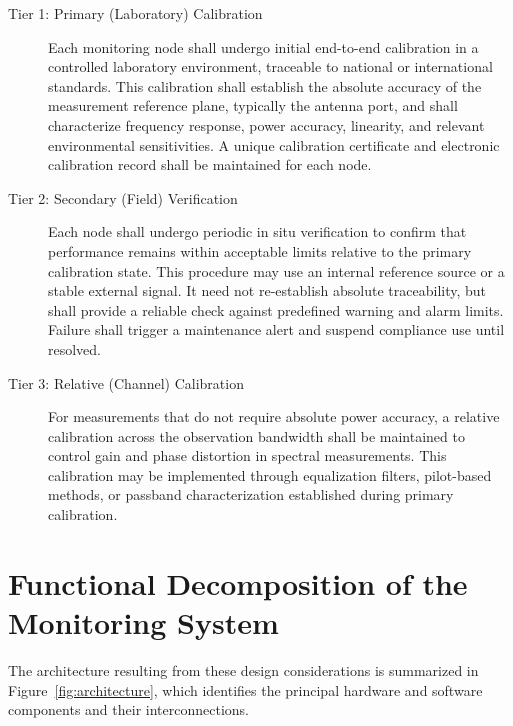 \documentclass[11pt]{article}
\begin{document}
\begin{description}

\item[Tier 1: Primary (Laboratory) Calibration] Each monitoring node shall undergo initial end-to-end calibration in a controlled laboratory environment, traceable to national or international standards. This calibration shall establish the absolute accuracy of the measurement reference plane, typically the antenna port, and shall characterize frequency response, power accuracy, linearity, and relevant environmental sensitivities. A unique calibration certificate and electronic calibration record shall be maintained for each node.

\item[Tier 2: Secondary (Field) Verification] Each node shall undergo periodic in situ verification to confirm that performance remains within acceptable limits relative to the primary calibration state. This procedure may use an internal reference source or a stable external signal. It need not re-establish absolute traceability, but shall provide a reliable check against predefined warning and alarm limits. Failure shall trigger a maintenance alert and suspend compliance use until resolved.

\item[Tier 3: Relative (Channel) Calibration] For measurements that do not require absolute power accuracy, a relative calibration across the observation bandwidth shall be maintained to control gain and phase distortion in spectral measurements. This calibration may be implemented through equalization filters, pilot-based methods, or passband characterization established during primary calibration.

\end{description}

\section{Functional Decomposition of the Monitoring System}

The architecture resulting from these design considerations is summarized in Figure~\ref{fig:architecture}, which identifies the principal hardware and software components and their interconnections.
\end{document}

